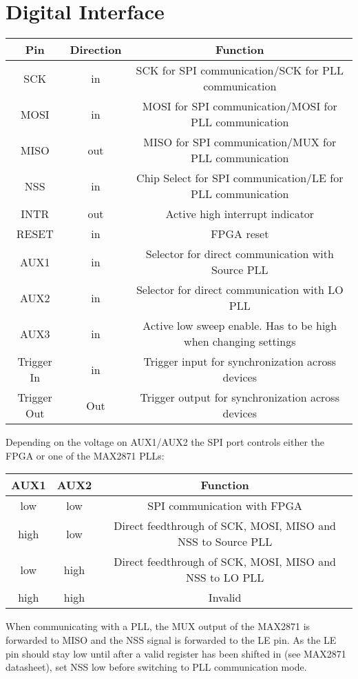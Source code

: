 \documentclass{article}
\begin{document}
\section{Digital Interface}
\begin{center}
\begin{tabular}{ c|c|c }
Pin & Direction & Function\\
 \hline
SCK & in & SCK for SPI communication/SCK for PLL communication\\
MOSI & in & MOSI for SPI communication/MOSI for PLL communication\\
MISO & out & MISO for SPI communication/MUX for PLL communication\\
NSS & in & Chip Select for SPI communication/LE for PLL communication\\
INTR & out & Active high interrupt indicator\\
RESET\footnotemark & in & FPGA reset\\
AUX1 & in & Selector for direct communication with Source PLL\\
AUX2 & in & Selector for direct communication with LO PLL\\
AUX3 & in & Active low sweep enable. Has to be high when changing settings\\
Trigger In\footnotemark & in & Trigger input for synchronization across devices\\
Trigger Out\footnotemark & Out & Trigger output for synchronization across devices\\
\end{tabular}
\end{center}
Depending on the voltage on AUX1/AUX2 the SPI port controls either the FPGA or one of the MAX2871 PLLs:
\begin{center}
\begin{tabular}{ c|c|c }
AUX1 & AUX2 & Function\\
 \hline
low & low & SPI communication with FPGA\\
high & low & Direct feedthrough of SCK, MOSI, MISO and NSS to Source PLL\\
low & high & Direct feedthrough of SCK, MOSI, MISO and NSS to LO PLL\\
high & high & Invalid\\
\end{tabular}
\end{center}
When communicating with a PLL, the MUX output of the MAX2871 is forwarded to MISO and the NSS signal is forwarded to the LE pin. As the LE pin should stay low until after a valid register has been shifted in (see MAX2871 datasheet), set NSS low before switching to PLL communication mode.
\end{document}

